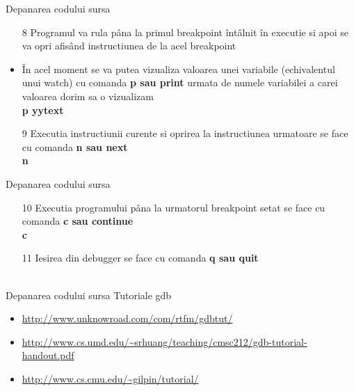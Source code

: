 \documentclass[pdf]{beamer}
\begin{document}
\begin{frame}{Depanarea codului sursa}
\begin{itemize}
\item[8]
Programul va rula pâna la primul breakpoint întâlnit în executie si apoi se va opri afisând instructiunea de la acel breakpoint
\item
În acel moment se va putea vizualiza valoarea unei variabile (echivalentul unui watch) cu comanda \textbf{p sau print} urmata de numele variabilei a carei valoarea dorim sa o vizualizam\\
\hspace{10mm} \textbf{p yytext}\\
\item[9]
Executia instructiunii curente si oprirea la instructiunea urmatoare se face cu comanda  \textbf{n sau next}\\
\hspace{10mm} \textbf{n}\\

\end{itemize}
\end{frame}



\begin{frame}{Depanarea codului sursa}
\begin{itemize}
\item[10]
Executia programului pâna la urmatorul breakpoint setat se face cu comanda \textbf{c sau continue}\\
\hspace{10mm} \textbf{c}\\
\item[11]
Iesirea din debugger se face cu comanda \textbf{q sau quit} \\~\\
\end{itemize}
\end{frame}



\begin{frame}{Depanarea codului sursa}
Tutoriale gdb
\begin{itemize}
\item
\url{http://www.unknowroad.com/com/rtfm/gdbtut/}

\item
\url{http://www.cs.umd.edu/~srhuang/teaching/cmsc212/gdb-tutorial-handout.pdf}

\item
\url{http://www.cs.cmu.edu/~gilpin/tutorial/}
\end{itemize}
\end{frame}
\end{document}
